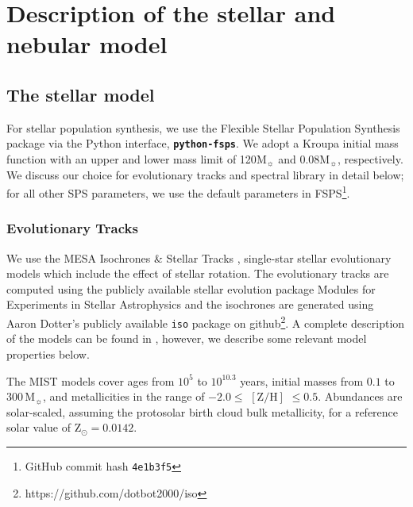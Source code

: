 \documentclass[preprint2,trackchanges]{aastex62}
\newcommand{\FSPS}{{\sc FSPS}\xspace}
\newcommand{\pFSPS}{{\tt \textbf{python-fsps}}\xspace}
\newcommand\Msun{\ensuremath{\mathrm{M_{\sun}}}\xspace}
\begin{document}
\section{Description of the stellar and nebular model} \label{sec:model}

\subsection{The stellar model}\label{sec:model:stellar}

For stellar population synthesis, we use the Flexible Stellar Population Synthesis package \citep[\FSPS;][]{Conroy+2009, Conroy+2010} via the Python interface, \pFSPS \citep{pythonFSPSdfm}. We adopt a Kroupa initial mass function \citep[IMF;][]{Kroupa+2001} with an upper and lower mass limit of 120\Msun and 0.08\Msun, respectively. We discuss our choice for evolutionary tracks and spectral library in detail below; for all other SPS parameters, we use the default parameters in \FSPS\footnote{GitHub commit hash \texttt{4e1b3f5}}.

\subsubsection{Evolutionary Tracks}
We use the MESA Isochrones \& Stellar Tracks \citep[MIST;][]{Dotter+2016, Choi+2016}, single-star stellar evolutionary models which include the effect of stellar rotation. The evolutionary tracks are computed using the publicly available stellar evolution package Modules for Experiments in Stellar Astrophysics \citep[MESA v7503;][]{Paxton+2011,Paxton+2013, Paxton+2015} and the isochrones are generated using Aaron Dotter's publicly available \texttt{iso} package on github\footnote{https://github.com/dotbot2000/iso}. A complete description of the models can be found in \citet{Choi+2016}, however, we describe some relevant model properties below. 

The MIST models cover ages from $10^5$ to $10^{10.3}$ years, initial masses from $0.1$ to $300\,$\Msun, and metallicities in the range of $-2.0 \leq$ $[\mathrm{Z}/\mathrm{H}]$ $\leq 0.5$. Abundances are solar-scaled, assuming the \citet{Asplund+2009} protosolar birth cloud bulk metallicity, for a reference solar value of $\mathrm{Z}_{\odot} = 0.0142$.
\end{document}
